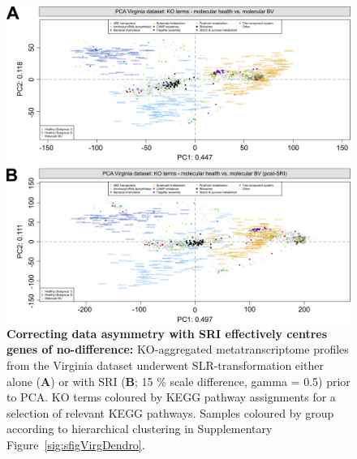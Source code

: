 \documentclass[sn-mathphys,Numbered]{sn-jnl}%
\begin{document}
\begin{figure}[H]
    \centering
    \includegraphics[scale = 0.95]{0_supplFig5.png}
    \caption{\textbf{Correcting data asymmetry with SRI effectively centres genes of no-difference:} KO-aggregated metatranscriptome profiles from the Virginia dataset underwent SLR-transformation either alone (\textbf{A}) or with SRI (\textbf{B}; 15 \% scale difference, gamma = 0.5) prior to PCA. KO terms coloured by KEGG pathway assignments for a selection of relevant KEGG pathways. Samples coloured by group according to hierarchical clustering in Supplementary Figure~\ref{sig:sfigVirgDendro}.} \label{fig:sfigVirgKOcent}
\end{figure}
\newpage
\end{document}
